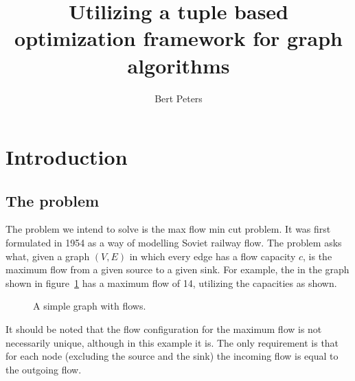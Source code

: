 \documentclass[10pt,a4paper,hidelinks]{article}
\author{Bert Peters}
\title{Utilizing a tuple based optimization framework for graph algorithms}
\begin{document}
\maketitle

\tableofcontents

\section{Introduction}

\subsection{The problem}

The problem we intend to solve is the max flow min cut problem. It was first formulated in 1954 as a way of modelling Soviet railway flow\cite{HarrisRoss}. The problem asks what, given a graph $(V,E)$ in which every edge has a flow capacity $c$, is the maximum flow from a given source to a given sink. For example, the in the graph shown in figure~\ref{fig:simple-graph} has a maximum flow of 14, utilizing the capacities as shown.

\begin{figure}[h]
\centering
{}
\caption{A simple graph with flows.}
\label{fig:simple-graph}
\end{figure}

It should be noted that the flow configuration for the maximum flow is not necessarily unique, although in this example it is. The only requirement is that for each node (excluding the source and the sink) the incoming flow is equal to the outgoing flow.
\end{document}
